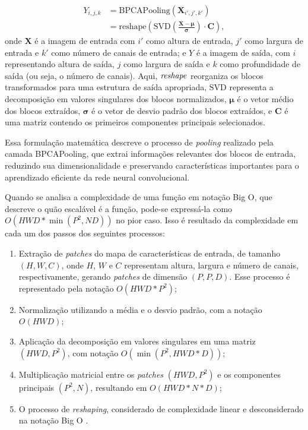 \begin{equation}
    \label{project:eq:bpca}
    \begin{split}
        Y_{i,j,k} &= \text{BPCAPooling}(\boldsymbol{X}_{i',j',k'}) \\
                  &= \text{reshape}\left(\text{SVD}\left(\frac{{\boldsymbol{X} - \boldsymbol{\mu}}}{{\boldsymbol{\sigma}}}\right) \cdot \boldsymbol{C}\right),
    \end{split}
\end{equation}
onde $\boldsymbol{X}$ é a imagem de entrada com $i'$ como altura de entrada, $j'$ como largura de entrada e $k'$ como número de canais de entrada; e $Y$ é a imagem de saída, com $i$ representando altura de saída, $j$ como largura de saída e $k$ como profundidade de saída (ou seja, o número de canais). Aqui, $\text{\textit{reshape}}$ reorganiza os blocos transformados para uma estrutura de saída apropriada, $\text{SVD}$ representa a decomposição em valores singulares dos blocos normalizados, $\boldsymbol{\mu}$ é o vetor médio dos blocos extraídos, $\boldsymbol{\sigma}$ é o vetor de desvio padrão dos blocos extraídos, e $\boldsymbol{C}$ é uma matriz contendo os primeiros componentes principais selecionados.

Essa formulação matemática descreve o processo de \textit{pooling} realizado pela camada BPCAPooling, que extrai informações relevantes dos blocos de entrada, reduzindo sua dimensionalidade e preservando características importantes para o aprendizado eficiente da rede neural convolucional.

Quando se analisa a complexidade de uma função em notação Big O, que descreve o quão escalável é a função, pode-se expressá-la como $O(HWD * \min(P^2, ND))$ no pior caso. Isso é resultado da complexidade em cada um dos passos dos seguintes processos:

\begin{enumerate}
    \item Extração de \textit{patches} do mapa de características de entrada, de tamanho $(H,W,C)$, onde $H$, $W$ e $C$ representam altura, largura e número de canais, respectivamente, gerando \textit{patches} de dimensão $(P,P,D)$. Esse processo é representado pela notação $O(HWD * P^2)$;
    \item Normalização utilizando a média e o desvio padrão, com a notação $O(HWD)$;
    \item Aplicação da decomposição em valores singulares em uma matriz $(HWD, P^2)$, com notação $O(\min(P^2, HWD * D))$;
    \item Multiplicação matricial entre os \textit{patches} $(HWD, P^2)$ e os componentes principais $(P^2, N)$, resultando em $O(HWD * N * D)$;
    \item O processo de \textit{reshaping}, considerado de complexidade linear e desconsiderado na notação Big O \citep{devi2011abstract}.
\end{enumerate}

